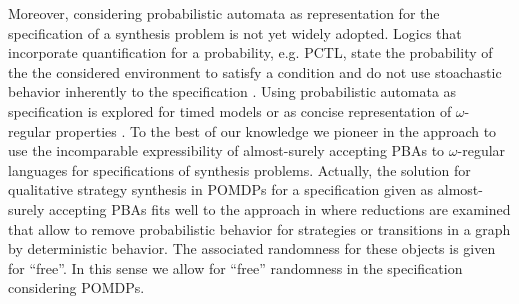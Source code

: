Moreover, considering probabilistic automata as representation for the
specification of a synthesis problem is not yet widely adopted. Logics that
incorporate quantification for a probability, e.g. \textsc{PCTL}, state the
probability of the the considered environment to satisfy a condition and do not
use stoachastic behavior inherently to the specification \cite{PrinciplesOfMC}.
Using probabilistic automata as specification is explored for timed models
\cite{VerificationAndControl} or as concise representation of $\omega$-regular
properties \cite{PBAforLTLSafety}. To the best of our knowledge we pioneer in
the approach to use the incomparable expressibility of almost-surely accepting
\aclp*{PBA} to $\omega$-regular languages for specifications of synthesis
problems. Actually, the solution for qualitative strategy synthesis in
\aclp*{POMDP} for a specification given as almost-surely accepting \aclp*{PBA}
fits well to the approach in \cite{RandomnessForFree} where reductions are
examined that allow to remove probabilistic behavior for strategies or
transitions in a graph by deterministic behavior. The associated randomness for
these objects is given for \enquote{free}. In this sense we allow for
\enquote{free} randomness in the specification considering \aclp*{POMDP}.
